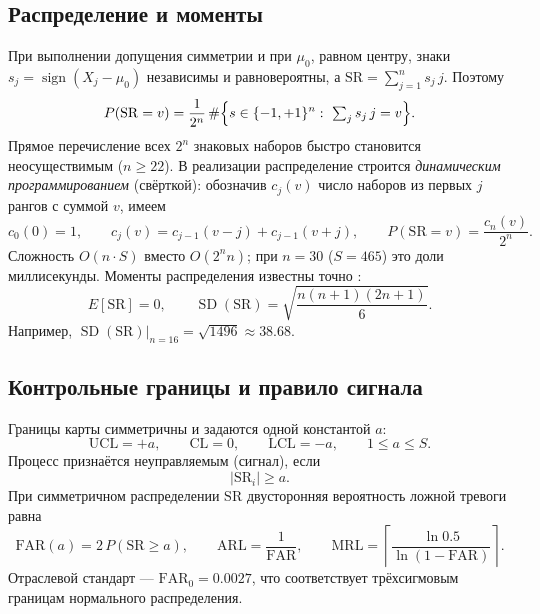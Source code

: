 \documentclass[11pt,a4paper]{article}
\newcommand{\SR}{\mathrm{SR}}
\newcommand{\FAR}{\mathrm{FAR}}
\newcommand{\ARL}{\mathrm{ARL}}
\newcommand{\MRL}{\mathrm{MRL}}
\newcommand{\FARz}{\mathrm{FAR}_0}
\newcommand{\SD}{\operatorname{SD}}
\begin{document}
\subsection{Распределение и моменты}
\label{sec:sr-dist}

При выполнении допущения симметрии и при $\mu_0$, равном центру, знаки
$s_j=\operatorname{sign}(X_j-\mu_0)$ независимы и равновероятны, а
$\SR=\sum_{j=1}^{n}s_j\,j$. Поэтому
\begin{equation}
P(\SR=v)=\frac{1}{2^n}\,\#\Bigl\{s\in\{-1,+1\}^n:\ \textstyle\sum_j s_j\,j=v\Bigr\}.
\label{eq:dist}
\end{equation}
Прямое перечисление всех $2^n$ знаковых наборов быстро становится
неосуществимым ($n\ge22$). В реализации распределение строится
\emph{динамическим программированием} (свёрткой): обозначив $c_j(v)$ число
наборов из первых $j$ рангов с суммой $v$, имеем
\begin{equation}
c_0(0)=1,\qquad
c_j(v)=c_{j-1}(v-j)+c_{j-1}(v+j),\qquad
P(\SR=v)=\frac{c_n(v)}{2^n}.
\label{eq:dp}
\end{equation}
Сложность $O(n\cdot S)$ вместо $O(2^n n)$; при $n=30$ ($S=465$) это доли
миллисекунды. Моменты распределения известны точно
\cite[с.~200, табл.~4.3]{Chakraborti2019}:
\begin{equation}
E[\SR]=0,\qquad
\SD(\SR)=\sqrt{\frac{n(n+1)(2n+1)}{6}}.
\label{eq:sd}
\end{equation}
Например, $\SD(\SR)\big|_{n=16}=\sqrt{1496}\approx38.68$.

\subsection{Контрольные границы и правило сигнала}
\label{sec:sr-limits}

Границы карты симметричны и задаются одной константой $a$:
\begin{equation}
\mathrm{UCL}=+a,\qquad \mathrm{CL}=0,\qquad \mathrm{LCL}=-a,
\qquad 1\le a\le S .
\label{eq:limits}
\end{equation}
Процесс признаётся неуправляемым (сигнал), если
\begin{equation}
|\SR_i|\ge a .
\label{eq:signal}
\end{equation}
При симметричном распределении $\SR$ двусторонняя вероятность ложной
тревоги равна
\begin{equation}
\FAR(a)=2\,P(\SR\ge a),\qquad
\ARL=\frac{1}{\FAR},\qquad
\MRL=\left\lceil \frac{\ln 0.5}{\ln(1-\FAR)}\right\rceil .
\label{eq:far}
\end{equation}
Отраслевой стандарт --- $\FARz=0.0027$, что соответствует трёхсигмовым
границам нормального распределения.
\end{document}
